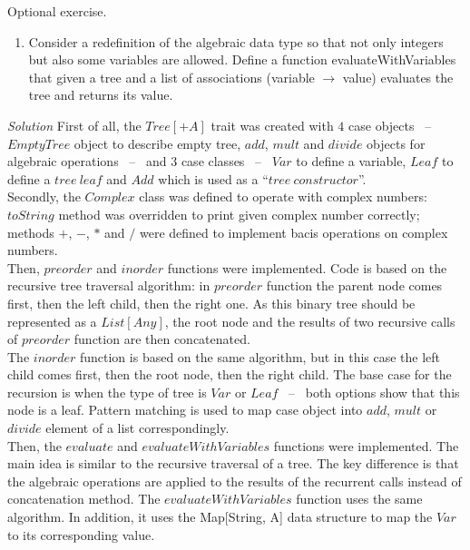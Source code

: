 \documentclass[a4paper]{article}
\begin{document}
Optional exercise.
\begin{enumerate} 
	\item Consider a redefinition of the algebraic data type so that not only integers but also some variables are allowed. Define a function evaluateWithVariables that given a tree and a list of associations (variable $\rightarrow$ value) evaluates the tree and returns its value.
\end{enumerate} 
{\Large \emph{Solution}}
\newline
\newline
First of all, the $Tree[+A]$ trait was created with $4$ case objects \ -- \ $EmptyTree$ object to describe empty tree, $add$, $mult$ and $divide$ objects for algebraic operations \ -- \ and $3$ case classes \ -- \ $Var$ to define a variable, $Leaf$ to define a $tree \ leaf$ and $Add$ which is used as a ``$tree \ constructor$''. \\
\newline
Secondly, the $Complex$ class was defined to operate with complex numbers: $toString$ method was overridden to print given complex number correctly; methods $+$, $-$, $*$ and $/$ were defined to implement bacis operations on complex numbers. \\
\newline
Then, $preorder$ and $inorder$ functions were implemented. Code is based on the recursive tree traversal algorithm: in $preorder$ function the parent node comes first, then the left child, then the right one. As this binary tree should be represented as a $List[Any]$, the root node and the results of two recursive calls of $preorder$ function are then concatenated. \\
\newline
The $inorder$ function is based on the same algorithm, but in this case the left child comes first, then the root node, then the right child. The base case for the recursion is when the type of tree is $Var$ or $Leaf$ \ -- \ both options show that this node is a leaf. Pattern matching is used to map case object into $add$, $mult$ or $divide$ element of a list correspondingly. \\
\newline
Then, the $evaluate$ and $evaluateWithVariables$ functions were implemented. The main idea is similar to the recursive traversal of a tree. The key difference is that the algebraic operations are applied to the results of the recurrent calls instead of concatenation method. The $evaluateWithVariables$ function uses the same algorithm. In addition, it uses the Map[String, A] data structure to map the $Var$ to its corresponding value. \\
\end{document}
